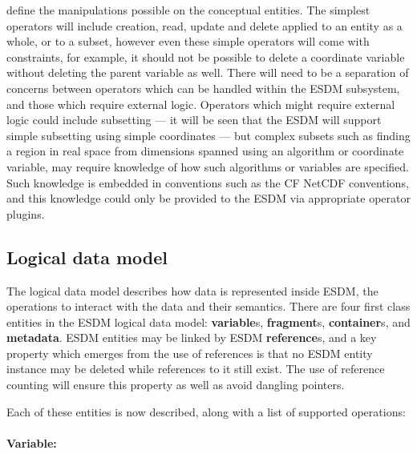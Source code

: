 define the manipulations possible on the conceptual entities.
The simplest operators will include creation, read, update and delete applied to an entity as a whole, or to a subset, however even these simple operators will come with constraints, for example, it should not be possible to delete a coordinate variable without deleting the parent variable as well.
There will need to be a separation of concerns between operators which can be handled within the ESDM subsystem, and those which require external logic.
Operators which might require external logic could include subsetting --- it will be seen that the ESDM will support simple subsetting using simple coordinates --- but complex subsets such as finding a region in real space from dimensions spanned using an algorithm or coordinate variable, may require knowledge of how such algorithms or variables are specified.
Such knowledge is embedded in conventions such as the CF NetCDF conventions, and this knowledge could only be provided to the ESDM via appropriate operator plugins.
 
\subsection{Logical data model}

The logical data model describes how data is represented inside ESDM, the operations to interact with the data and their semantics.
There are four first class entities in the ESDM logical data model: \textbf{variable}s, \textbf{fragment}s, \textbf{container}s, and \textbf{metadata}.
ESDM entities may be linked by ESDM \textbf{reference}s, and a key property which emerges from the use of references is that no ESDM entity instance may be deleted while references to it still exist.
The use of reference counting will ensure this property as well as avoid dangling pointers.
 

Each of these entities is now described, along with a list of supported operations:

\paragraph{Variable:}%
\label{variable-1}

